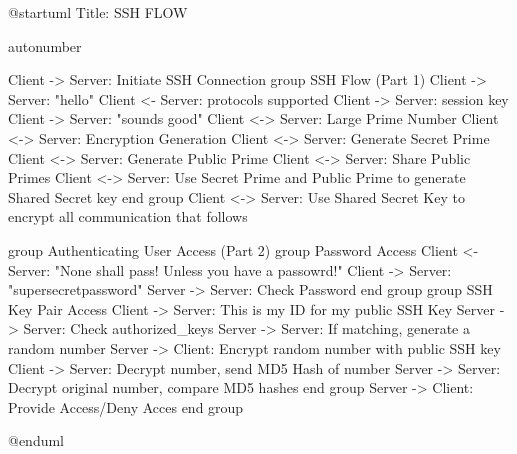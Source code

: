 @startuml
Title: SSH FLOW

autonumber

  Client -> Server: Initiate SSH Connection
group SSH Flow (Part 1)
  Client -> Server: "hello"
  Client <- Server: protocols supported
  Client -> Server: session key
  Client -> Server: "sounds good"
  Client <-> Server: Large Prime Number
  Client <-> Server: Encryption Generation
  Client <-> Server: Generate Secret Prime
  Client <-> Server: Generate Public Prime
  Client <-> Server: Share Public Primes
  Client <-> Server: Use Secret Prime and Public Prime to generate Shared Secret key
end group
  Client <-> Server: Use Shared Secret Key to encrypt all communication that follows

group Authenticating User Access (Part 2)
  group Password Access
  Client <- Server: "None shall pass! Unless you have a passowrd!"
  Client -> Server: "supersecretpassword"
  Server -> Server: Check Password
  end group
  group SSH Key Pair Access
  Client -> Server: This is my ID for my public SSH Key
  Server -> Server: Check authorized_keys
  Server -> Server: If matching, generate a random number
  Server -> Client: Encrypt random number with public SSH key
  Client -> Server: Decrypt number, send MD5 Hash of number
  Server -> Server: Decrypt original number, compare MD5 hashes
  end group
  Server -> Client: Provide Access/Deny Acces
end group

@enduml
